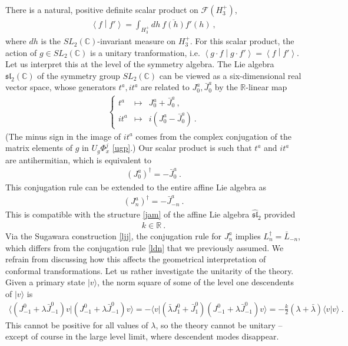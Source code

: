 \documentclass[12pt, a4paper, notitlepage, twoside]{report}
\numberwithin{equation}{section}
\theoremstyle{break}
\begin{document}
There is a natural, positive definite scalar product on $\mathcal{F}(H_3^+)$, 
\begin{align}
 \left\langle f \middle| f' \right\rangle = \int_{H_3^+} dh\ \overline{f(h)} f'(h)\ ,
\end{align}
where $dh$ is the $SL_2({\mathbb{C}})$-invariant measure on $H_3^+$.
For this scalar product, the action of $g\in SL_2({\mathbb{C}})$ is a unitary tranformation, i.e. $\left\langle g\cdot f \middle| g\cdot f'\right\rangle = \left\langle f \middle| f'\right\rangle $.
Let us interpret this at the level of the symmetry algebra.
The Lie algebra $\mathfrak{sl}_2({\mathbb{C}})$ of the symmetry group $SL_2({\mathbb{C}})$ can be viewed as a six-dimensional real vector space, whose generators $t^a,it^a$ are related to $J^a_0, \bar{J}^a_0$ by the ${\mathbb{R}}$-linear map
\begin{align}
 \left\{\begin{array}{lcl} t^a & \mapsto & J_0^a + \bar{J}_0^a \ ,  \\ it^a & \mapsto & i(J^a_0 - \bar{J}^a_0)\ . \end{array}\right. 
\end{align}
(The minus sign in the image of $it^a$ comes from the complex conjugation of the matrix elements of $g$ in $U_g\Phi^j_{x}$ \eqref{ugp}.)
Our scalar product is such that $t^a$ and $it^a$ are antihermitian, which is equivalent to
\begin{align}
 (J^a_0)^\dagger = -\bar{J}^a_0\ .
\label{jzd}
\end{align}
This conjugation rule can be extended to the entire affine Lie algebra as 
\begin{align}
 \boxed{(J^a_n)^\dagger = -\bar{J}^a_{-n}}\ .
\label{jdj}
\end{align}
This is compatible with the structure \eqref{jam} of the affine Lie algebra $\hat{\mathfrak{sl}}_2$ provided 
\begin{align}
 k\in\mathbb{R}\ .
\label{kir}
\end{align}
Via the Sugawara construction \eqref{ljj}, the conjugation rule for $J^a_n$ implies $L_n^\dagger = \bar{L}_{-n}$, which differs from the conjugation rule \eqref{ldn} that we previously assumed. 
We refrain from discussing how this affects the geometrical interpretation of conformal transformations.
Let us rather investigate the unitarity of the theory. 
Given a primary state $|v\rangle$, the norm square of some of the level one descendents of $|v\rangle$ is
\begin{align}
 \Big\langle (J^0_{-1}+\lambda\bar{J}^0_{-1})v \Big| (J^0_{-1}+\lambda\bar{J}^0_{-1})v \Big\rangle
= -\Big\langle v \Big| (\bar{\lambda} J^0_1+\bar{J}^0_1)(J^0_{-1}+\lambda\bar{J}^0_{-1})v \Big\rangle 
= -\frac{k}{2}(\lambda+\bar{\lambda}) \langle v| v\rangle\ .
\label{viv}
\end{align}
This cannot be positive for all values of $\lambda$,  
so the theory cannot be unitary -- except of course in the large level limit, where descendent modes disappear. 
\end{document}
